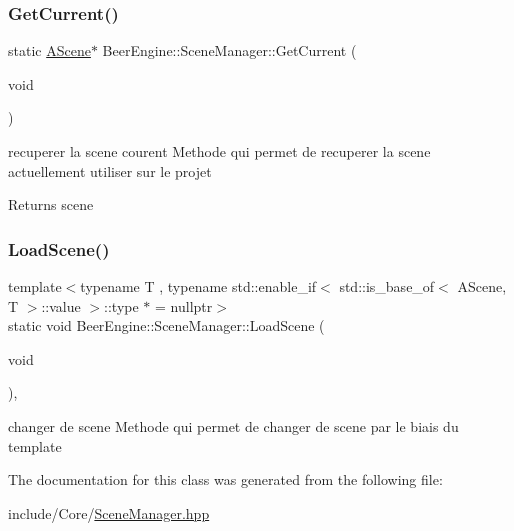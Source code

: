 \subsubsection{\texorpdfstring{Get\+Current()}{GetCurrent()}}
{\footnotesize\ttfamily static \mbox{\hyperlink{class_beer_engine_1_1_a_scene}{A\+Scene}}$\ast$ Beer\+Engine\+::\+Scene\+Manager\+::\+Get\+Current (\begin{DoxyParamCaption}\item[{void}]{ }\end{DoxyParamCaption})\hspace{0.3cm}{\ttfamily [static]}}



recuperer la scene courent Methode qui permet de recuperer la scene actuellement utiliser sur le projet 

\begin{DoxyReturn}{Returns}
scene 
\end{DoxyReturn}
\mbox{\label{class_beer_engine_1_1_scene_manager_a9414ed3c9d4a170e198afe83d15db360}} 
\subsubsection{\texorpdfstring{Load\+Scene()}{LoadScene()}}
{\footnotesize\ttfamily template$<$typename T , typename std\+::enable\+\_\+if$<$ std\+::is\+\_\+base\+\_\+of$<$ A\+Scene, T $>$\+::value $>$\+::type $\ast$  = nullptr$>$ \\
static void Beer\+Engine\+::\+Scene\+Manager\+::\+Load\+Scene (\begin{DoxyParamCaption}\item[{void}]{ }\end{DoxyParamCaption})\hspace{0.3cm}{\ttfamily [inline]}, {\ttfamily [static]}}



changer de scene Methode qui permet de changer de scene par le biais du template 



The documentation for this class was generated from the following file\+:\begin{DoxyCompactItemize}
\item 
include/\+Core/\mbox{\hyperlink{_scene_manager_8hpp}{Scene\+Manager.\+hpp}}\end{DoxyCompactItemize}
